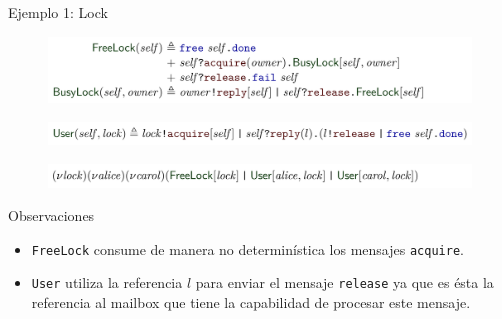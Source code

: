 \documentclass{beamer}
\newcommand{\msgtag}[1]{\texttt{\textcolor{msg-color}{#1}}}
\begin{document}
\begin{frame}{Ejemplo 1: Lock}
    \begin{figure}[H]
        \centering
        \includegraphics[width=\textwidth]{example1-lock}
    \end{figure}
    \vspace{-1em}
    \begin{figure}[H]
        \centering
        \includegraphics[width=\textwidth]{example1-user}
    \end{figure}
    \vspace{-1em}
    \begin{figure}[H]
        \centering
        \includegraphics[width=\textwidth]{example1-usage}
    \end{figure}

    \begin{block}{Observaciones}
        \begin{itemize}
            \item \texttt{FreeLock} consume de manera no determinística los mensajes \msgtag{acquire}.
            \item \texttt{User} utiliza la referencia $l$ para enviar el mensaje \msgtag{release} ya que es ésta la referencia al mailbox que tiene la capabilidad de procesar este mensaje.
        \end{itemize}
    \end{block}
\end{frame}
\end{document}
